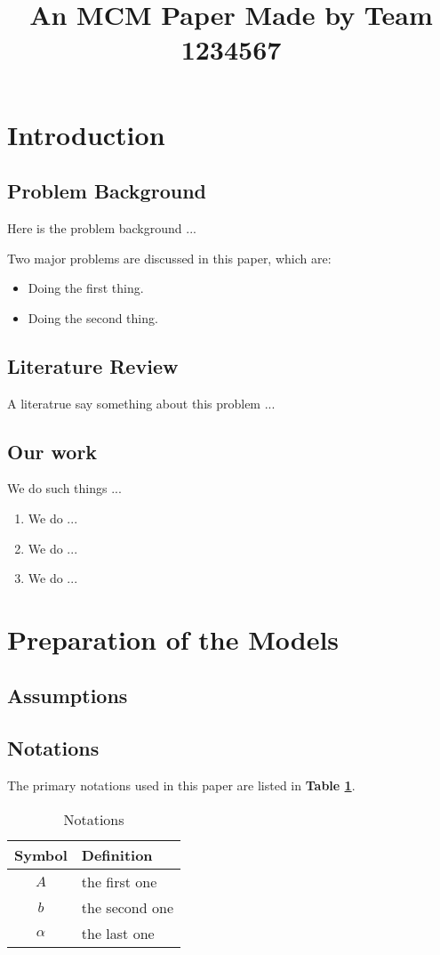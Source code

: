 \documentclass[12pt]{article}
\title{An MCM Paper Made by Team 1234567}  %
\begin{document}

\section{Introduction}
\subsection{Problem Background}
Here is the problem background ...

Two major problems are discussed in this paper, which are:
\begin{itemize}
    \item Doing the first thing.
    \item Doing the second thing.
\end{itemize}

\subsection{Literature Review}
A literatrue\cite{1} say something about this problem ...

\subsection{Our work}
We do such things ...

\begin{enumerate}[\bfseries 1.]
    \item We do ...
    \item We do ...
    \item We do ...
\end{enumerate}

\section{Preparation of the Models}
\subsection{Assumptions}

\subsection{Notations}
The primary notations used in this paper are listed in \textbf{Table \ref{tb:notation}}.
\begin{table}[!htbp]
\begin{center}
\caption{Notations}
\begin{tabular}{cl}
	\toprule
	\multicolumn{1}{m{3cm}}{\centering Symbol}
	&\multicolumn{1}{m{8cm}}{\centering Definition}\\
	\midrule
	$A$&the first one\\
	$b$&the second one\\
	$\alpha$ &the last one\\
	\bottomrule
\end{tabular}\label{tb:notation}
\end{center}
\end{table}
\end{document}
